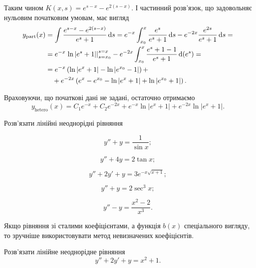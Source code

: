 \begin{solution}
	Таким чином $K(x, s) = e^{s - x} - e^{2(s - x)}$. І частинний роз\-в'яз\-ок, що задовольняє нульовим початковим умовам, має вигляд
	\begin{align*}
		y_{\text{part}}(x) &= \int \frac{e^{s - x} - e^{2(s - x)}}{e^s + 1} \mathop{}\!\mathrm{d} s = e^{-x} \int_{x_0}^x \frac{e^s}{e^s + 1} \mathop{}\!\mathrm{d} s - e^{-2x} \frac{e^{2 s}}{e^s + 1} \mathop{}\!\mathrm{d} s = \\ &= e^{-x} \left. \ln |e^s + 1| \right|_{s = x_0}^{s = x} - e^{-2x} \int_{x_0}^x \frac{e^s + 1 - 1}{e^s + 1} \mathop{}\!\mathrm{d} (e^s) = \\ &= e^{-x} \left( \ln |e^x + 1| - \ln |e^{x_0} - 1| \right) + \\ & \quad + e^{-2x} \left( e^x - e^{x_0} - \ln |e^x + 1| + \ln |e^{x_0} + 1| \right).
	\end{align*}
	
	Враховуючи, що початкові дані не задані, остаточно отримаємо
	\begin{equation*}
		y_{\text{hetero}}(x) = C_1 e^{-x} + C_2 e^{-2x} + e^{-x} \ln |e^x + 1| + e^{-2x} \ln |e^x + 1|.
	\end{equation*}
\end{solution}

Розв'язати лінійні неоднорідні рівняння
\begin{multicols}{2}
    \begin{problem}
    	\[y'' + y = \frac{1}{\sin x};\]
    \end{problem}
    
    \begin{problem}
    	\[y'' + 4 y = 2 \tan x;\]
    \end{problem}
    
    \begin{problem}
    	\[y'' + 2 y' + y = 3 e^{-x \sqrt{x + 1}};\]
    \end{problem}
    
    \begin{problem}
    	\[y'' + y = 2 \sec^3 x;\]
    \end{problem}
    
    \begin{problem}
    	\[y'' - y= \frac{x^2 - 2}{x^3}.\]
    \end{problem}
\end{multicols}

Якщо рівняння зі сталими коефіцієнтами, а функція $b(x)$ спеціального вигляду, то зручніше використовувати метод невизначених коефіцієнтів.

\begin{example}
	Розв'язати лінійне неоднорідне рівняння \[y'' + 2 y' + y = x^2 + 1.\]
\end{example}

